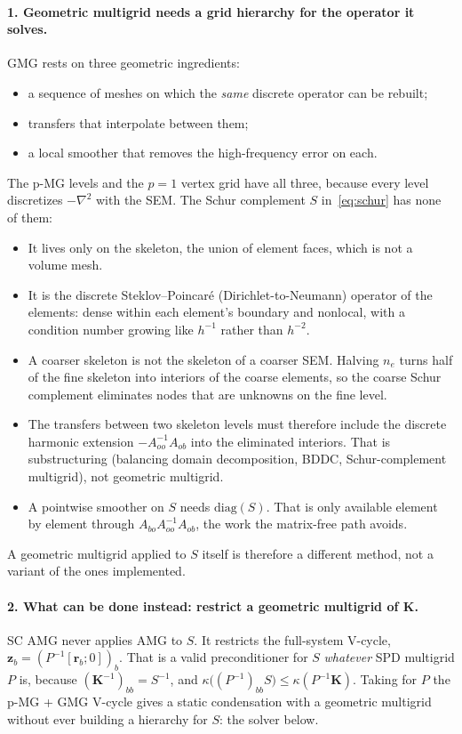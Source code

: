 \documentclass[11pt]{article}
\newcommand{\K}{\mathbf{K}}
\newcommand{\rr}{\mathbf{r}}
\newcommand{\zz}{\mathbf{z}}
\begin{document}
\paragraph{1. Geometric multigrid needs a grid hierarchy for the operator it solves.}
GMG rests on three geometric ingredients:
\begin{itemize}
  \item a sequence of meshes on which the \emph{same} discrete operator can be rebuilt;
  \item transfers that interpolate between them;
  \item a local smoother that removes the high-frequency error on each.
\end{itemize}
The p-MG levels and the $p=1$ vertex grid have all three, because every level discretizes $-\nabla^2$
with the SEM. The Schur complement $S$ in~\eqref{eq:schur} has none of them:
\begin{itemize}
  \item It lives only on the skeleton, the union of element faces, which is not a volume mesh.
  \item It is the discrete Steklov--Poincar\'e (Dirichlet-to-Neumann) operator of the elements: dense within each
        element's boundary and nonlocal, with a condition number growing like $h^{-1}$ rather than $h^{-2}$.
  \item A coarser skeleton is not the skeleton of a coarser SEM. Halving $n_e$ turns half of the fine skeleton
        into interiors of the coarse elements, so the coarse Schur complement eliminates nodes that are unknowns
        on the fine level.
  \item The transfers between two skeleton levels must therefore include the discrete harmonic extension
        $-A_{oo}^{-1}A_{ob}$ into the eliminated interiors. That is substructuring (balancing domain
        decomposition, BDDC, Schur-complement multigrid), not geometric multigrid.
  \item A pointwise smoother on $S$ needs $\mathrm{diag}(S)$. That is only available element by element
        through $A_{bo}A_{oo}^{-1}A_{ob}$, the work the matrix-free path avoids.
\end{itemize}
A geometric multigrid applied to $S$ itself is therefore a different method, not a variant of the ones implemented.

\paragraph{2. What can be done instead: restrict a geometric multigrid of $\K$.}
SC AMG never applies AMG to $S$. It restricts the full-system V-cycle, $\zz_b=(P^{-1}[\rr_b;0])_b$. That is a
valid preconditioner for $S$ \emph{whatever} SPD multigrid $P$ is, because $(\K^{-1})_{bb}=S^{-1}$, and
$\kappa\big((P^{-1})_{bb}S\big)\le\kappa(P^{-1}\K)$. Taking for $P$ the p-MG + GMG V-cycle gives a static condensation
with a geometric multigrid without ever building a hierarchy for $S$: the solver below.
\end{document}
